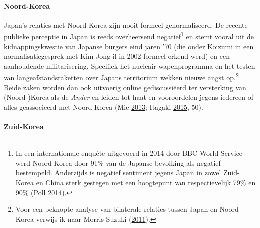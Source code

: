 \documentclass[10.5pt,dutch,]{article}
\let\oldparagraph\paragraph
\renewcommand{\paragraph}[1]{\oldparagraph{#1}\mbox{}}
\begin{document}
\paragraph{Noord-Korea}\label{noord-korea}

Japan's relaties met Noord-Korea zijn nooit formeel genormaliseerd. De
recente publieke perceptie in Japan is reeds overheersend
negatief\footnote{In een internationale enquête uitgevoerd in 2014 door
  BBC World Service werd Noord-Korea door 91\% van de Japanse bevolking
  als negatief bestempeld. Anderzijds is negatief sentiment jegens Japan
  in zowel Zuid-Korea en China sterk gestegen met een hoogtepunt van
  respectievelijk 79\% en 90\% (Poll
  \protect\hyperlink{ref-bbcux5fworldux5fserviceux5fpollux5f2014ux5f2014}{2014}).}
en stemt vooral uit de kidnappingskwestie van Japanse burgers eind jaren
'70 (die onder Koizumi in een normalisatiegesprek met Kim Jong-il in
2002 formeel erkend werd) en een aanhoudende militarisering. Specifiek
het nucleair wapenprogramma en het testen van langeafstandsraketten over
Japans territorium wekken nieuwe angst op.\footnote{Voor een beknopte
  analyse van bilaterale relaties tussen Japan en Noord-Korea verwijs ik
  naar Morris-Suzuki
  (\protect\hyperlink{ref-morris-suzukiux5fre-imaginingux5f2011}{2011}).}
Beide zaken worden dan ook uitvoerig online gediscussiëerd ter
versterking van (Noord-)Korea als de \emph{Ander} en leiden tot haat en
vooroordelen jegens iedereen of alles geassocieerd met Noord-Korea (Mie
\protect\hyperlink{ref-mieux5fxenophobiaux5f2013}{2013}; Itagaki
\protect\hyperlink{ref-itagakiux5fanatomyux5f2015}{2015}, 50).

\paragraph{Zuid-Korea}\label{zuid-korea}
\end{document}
